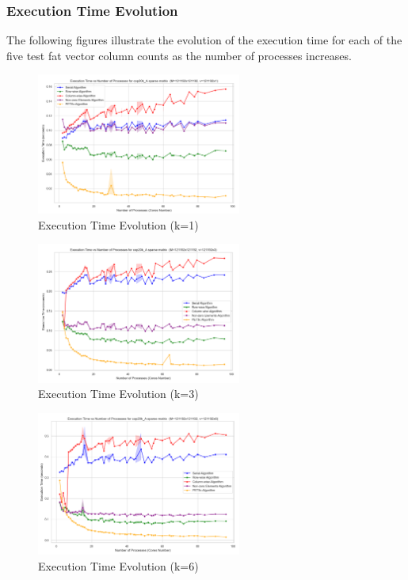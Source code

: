 \documentclass[12pt,oneside]{book} %
\begin{document}
\subsubsection{Execution Time Evolution}

The following figures illustrate the evolution of the execution time for each
of the five test fat vector column counts as the number of processes increases.

\begin{figure}[H]
    \centering
    \includegraphics[width=0.6\textwidth]{../results/fat_vector_dim/cop20k_A_k1_execution_time.png}
    \caption{Execution Time Evolution (k=1)}\label{fig:cop20k-a-k1-execution-time}
\end{figure}

\begin{figure}[H]
    \centering
    \includegraphics[width=0.6\textwidth]{../results/fat_vector_dim/cop20k_A_k3_execution_time.png}
    \caption{Execution Time Evolution (k=3)}\label{fig:cop20k-a-k3-execution-time}
\end{figure}

\begin{figure}[H]
    \centering
    \includegraphics[width=0.6\textwidth]{../results/fat_vector_dim/cop20k_A_k6_execution_time.png}
    \caption{Execution Time Evolution (k=6)}\label{fig:cop20k-a-k6-execution-time-2}
\end{figure}
\end{document}
